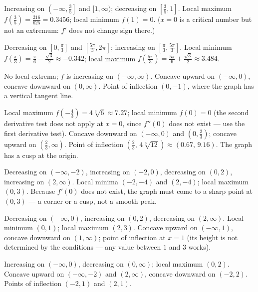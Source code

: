 \documentclass[11pt]{article}
\newcommand{\ansitem}[1]{\item[\textbf{#1.}]}
\begin{document}
\begin{ans}
  \ansitem{1} Increasing on $\left(-\infty,\tfrac{3}{5}\right]$ and $[1,\infty)$;
    decreasing on $\left[\tfrac{3}{5},1\right]$. Local maximum
    $f\!\left(\tfrac{3}{5}\right)=\tfrac{216}{625}=0.3456$; local minimum $f(1)=0$.
    ($x=0$ is a critical number but not an extremum: $f'$ does not change sign there.)

  \ansitem{2} Decreasing on $\left[0,\tfrac{\pi}{3}\right]$ and
    $\left[\tfrac{5\pi}{3},2\pi\right]$; increasing on
    $\left[\tfrac{\pi}{3},\tfrac{5\pi}{3}\right]$. Local minimum
    $f\!\left(\tfrac{\pi}{3}\right)=\tfrac{\pi}{6}-\tfrac{\sqrt3}{2}\approx-0.342$;
    local maximum
    $f\!\left(\tfrac{5\pi}{3}\right)=\tfrac{5\pi}{6}+\tfrac{\sqrt3}{2}\approx3.484$.

  \ansitem{3} No local extrema; $f$ is increasing on $(-\infty,\infty)$. Concave upward on
    $(-\infty,0)$, concave downward on $(0,\infty)$. Point of inflection $(0,-1)$, where
    the graph has a vertical tangent line.

  \ansitem{4} Local maximum $f\!\left(-\tfrac{4}{3}\right)=4\sqrt[3]{6}\approx7.27$;
    local minimum $f(0)=0$ (the second derivative test does not apply at $x=0$, since
    $f''(0)$ does not exist --- use the first derivative test). Concave downward on
    $(-\infty,0)$ and $\left(0,\tfrac{2}{3}\right)$; concave upward on
    $\left(\tfrac{2}{3},\infty\right)$. Point of inflection
    $\left(\tfrac{2}{3},\,4\sqrt[3]{12}\right)\approx(0.67,\,9.16)$. The graph has a cusp
    at the origin.

  \ansitem{5} Decreasing on $(-\infty,-2)$, increasing on $(-2,0)$, decreasing on $(0,2)$,
    increasing on $(2,\infty)$. Local minima $(-2,-4)$ and $(2,-4)$; local maximum
    $(0,3)$. Because $f'(0)$ does not exist, the graph must come to a sharp point at
    $(0,3)$ --- a corner or a cusp, not a smooth peak.

  \ansitem{6} Decreasing on $(-\infty,0)$, increasing on $(0,2)$, decreasing on
    $(2,\infty)$. Local minimum $(0,1)$; local maximum $(2,3)$. Concave upward on
    $(-\infty,1)$, concave downward on $(1,\infty)$; point of inflection at $x=1$ (its
    height is not determined by the conditions --- any value between $1$ and $3$ works).

  \ansitem{7} Increasing on $(-\infty,0)$, decreasing on $(0,\infty)$; local maximum
    $(0,2)$. Concave upward on $(-\infty,-2)$ and $(2,\infty)$, concave downward on
    $(-2,2)$. Points of inflection $(-2,1)$ and $(2,1)$.


\end{ans}
\end{document}
